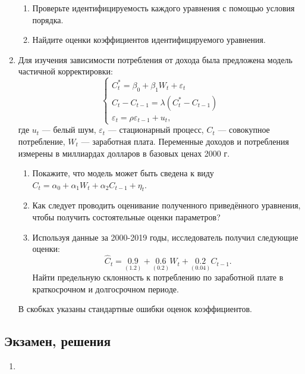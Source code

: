 \begin{enumerate}
  \begin{enumerate}
    \item Проверьте идентифицируемость каждого уравнения с помощью условия порядка.
    \item Найдите оценки коэффициентов идентифицируемого уравнения. 
  \end{enumerate}

  \item Для изучения зависимости потребления от дохода была предложена модель частичной корректировки:
  \[
  \begin{cases}
  C_{t}^{*}       = \beta_0 + \beta_1 W_t + \varepsilon_t \\
  C_{t} - C_{t-1} = \lambda (C_t^{*}-C_{t-1}) \\
  \varepsilon_t=\rho \varepsilon_{t-1} + u_t, 
  \end{cases}
  \]
  где $u_t$ — белый шум, $\varepsilon_t$ — стационарный процесс, $C_t$ — совокупное потребление, $W_t$ — заработная плата. 
  Переменные доходов и потребления измерены в миллиардах долларов в базовых ценах 2000 г.

  \begin{enumerate}
    \item Покажите, что модель может быть сведена к виду $C_{t}=\alpha_{0}+\alpha_{1} W_{t}+\alpha_{2} C_{t-1}+\eta_{t}$.
    \item Как следует проводить оценивание полученного приведённого уравнения, чтобы получить состоятельные оценки параметров?
    \item Используя данные за 2000-2019 годы, исследователь получил следующие оценки:
    \[
    \hat{C}_{t}=\underset{(1.2)}{0.9}+\underset{(0.2)}{0.6} W_{t}+\underset{(0.04)}{0.2} C_{t-1}.
    \]
    Найти предельную склонность к потреблению по заработной плате в краткосрочном и долгосрочном периоде. 
  \end{enumerate}

  В скобках указаны стандартные ошибки оценок коэффициентов.

\end{enumerate}


\subsection{Экзамен, решения}

\begin{enumerate}
  \item 
\end{enumerate}